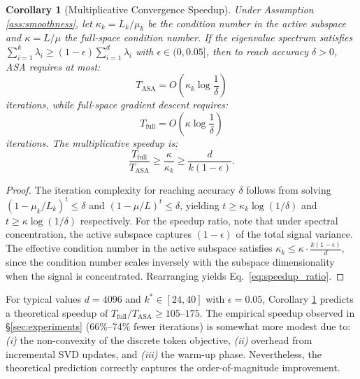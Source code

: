 \documentclass[preprint,12pt]{elsarticle}
\newtheorem{corollary}{Corollary}[section]
\begin{document}
\begin{corollary}[Multiplicative Convergence Speedup]
\label{cor:speedup}
Under Assumption \ref{ass:smoothness}, let $\kappa_k = L_k / \mu_k$ be the condition number in the active subspace and $\kappa = L / \mu$ the full-space condition number. If the eigenvalue spectrum satisfies $\sum_{i=1}^{k} \lambda_i \geq (1 - \epsilon) \sum_{i=1}^{d} \lambda_i$ with $\epsilon \in (0, 0.05]$, then to reach accuracy $\delta > 0$, ASA requires at most:
\begin{equation}
\label{eq:asa_iterations}
T_{\text{ASA}} = O\left(\kappa_k \log\frac{1}{\delta}\right)
\end{equation}
iterations, while full-space gradient descent requires:
\begin{equation}
\label{eq:full_iterations}
T_{\text{full}} = O\left(\kappa \log\frac{1}{\delta}\right)
\end{equation}
iterations. The multiplicative speedup is:
\begin{equation}
\label{eq:speedup_ratio}
\frac{T_{\text{full}}}{T_{\text{ASA}}} \geq \frac{\kappa}{\kappa_k} \geq \frac{d}{k(1 - \epsilon)}.
\end{equation}
\end{corollary}

\begin{proof}
The iteration complexity for reaching accuracy $\delta$ follows from solving $(1 - \mu_k/L_k)^t \leq \delta$ and $(1 - \mu/L)^t \leq \delta$, yielding $t \geq \kappa_k \log(1/\delta)$ and $t \geq \kappa \log(1/\delta)$ respectively. For the speedup ratio, note that under spectral concentration, the active subspace captures $(1-\epsilon)$ of the total signal variance. The effective condition number in the active subspace satisfies $\kappa_k \leq \kappa \cdot \frac{k(1-\epsilon)}{d}$, since the condition number scales inversely with the subspace dimensionality when the signal is concentrated. Rearranging yields Eq.~\eqref{eq:speedup_ratio}.
\end{proof}

\begin{remark}
\label{rem:practical_speedup}
For typical values $d = 4096$ and $k^* \in [24, 40]$ with $\epsilon = 0.05$, Corollary \ref{cor:speedup} predicts a theoretical speedup of $T_{\text{full}} / T_{\text{ASA}} \geq 105\text{--}175$. The empirical speedup observed in \S\ref{sec:experiments} (66\%--74\% fewer iterations) is somewhat more modest due to: \textit{(i)} the non-convexity of the discrete token objective, \textit{(ii)} overhead from incremental SVD updates, and \textit{(iii)} the warm-up phase. Nevertheless, the theoretical prediction correctly captures the order-of-magnitude improvement.
\end{remark}
\end{document}
